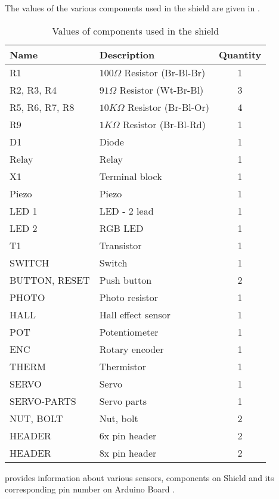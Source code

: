 The values of the various components used in the shield are given in 
.  
\begin{table}
\centering
\caption{Values of components used in the shield}
\label{tab:shield-values}
\begin{tabular}{|l|l|c|} \hline
Name & Description & Quantity \\ \hline
R1 & $100\Omega$ Resistor (Br-Bl-Br) & 1 \\ 
R2, R3, R4 & $91\Omega$ Resistor (Wt-Br-Bl) & 3 \\
R5, R6, R7, R8 & $10K\Omega$ Resistor (Br-Bl-Or) & 4 \\
R9 & $1K\Omega$ Resistor (Br-Bl-Rd) & 1 \\
D1 & Diode & 1 \\
Relay & Relay & 1 \\
X1 & Terminal block & 1 \\
Piezo & Piezo & 1 \\ 
LED 1 & LED - 2 lead & 1 \\
LED 2 & RGB LED & 1 \\
T1 & Transistor & 1 \\
SWITCH & Switch & 1 \\
BUTTON, RESET & Push button & 2 \\
PHOTO & Photo resistor & 1 \\
HALL & Hall effect sensor & 1 \\
POT & Potentiometer & 1 \\
ENC & Rotary encoder & 1 \\
THERM & Thermistor & 1 \\
SERVO & Servo & 1 \\
SERVO-PARTS & Servo parts & 1 \\
NUT, BOLT & Nut, bolt & 2 \\
HEADER & 6x pin header & 2 \\
HEADER & 8x pin header & 2 \\
\hline
\end{tabular}
\end{table}
 provides information about various sensors,
components on Shield and its corresponding pin number on Arduino Board
\cite{shield-ref}.  
